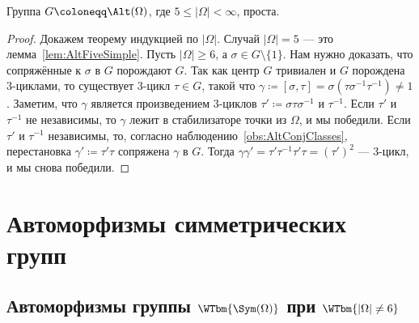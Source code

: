\documentclass[
	extrafontsizes,
	11pt,
	hyphens,
]{memoir}
\begin{document}
\begin{theorem}
Группа \(G \coloneqq \Alt(\Omega)\), где \(5 \leq \lvert \Omega \rvert < \infty\), проста.
\end{theorem}

\begin{proof}
Докажем теорему индукцией по \(\lvert \Omega \rvert\).
Случай \(\lvert \Omega \rvert = 5\) --- это лемма~\ref{lem:AltFiveSimple}.
Пусть \(\lvert \Omega \rvert \geq 6\),
а \(\sigma \in G \setminus \{1\}\).
Нам нужно доказать, что сопряжённые к \(\sigma\) в \(G\) порождают \(G\).
Так как центр \(G\) тривиален и \(G\) порождена \(3\)-цик\-ла\-ми, то существует \(3\)-цикл \(\tau \in G\), такой что \(\gamma \coloneqq [\sigma, \tau] = \sigma (\tau \sigma^{-1} \tau^{-1}) \neq 1\).
Заметим, что \(\gamma\) является произведением \(3\)-цик\-лов \(\tau' \coloneqq \sigma \tau \sigma^{-1}\) и \(\tau^{-1}\).
Если \(\tau'\) и \(\tau^{-1}\) не независимы, то \(\gamma\) лежит в стабилизаторе точки из \(\Omega\), и мы победили.
Если \(\tau'\) и \(\tau^{-1}\) независимы, то, согласно наблюдению~\ref{obs:AltConjClasses}, перестановка \(\gamma' \coloneqq \tau' \tau\) сопряжена \(\gamma\) в \(G\). Тогда \(\gamma \gamma' = \tau' {\tau}^{-1} \tau' \tau = (\tau')^2\) --- \(3\)-цикл, и мы снова победили.
\end{proof}


\section{Автоморфизмы симметрических групп}


\subsection{Автоморфизмы группы \texorpdfstring{\(\WTbm{\Sym(\Omega)}\)}{\textbackslash{}Sym(\textbackslash{}Omega)} при \texorpdfstring{\(\WTbm{\lvert \Omega \rvert \neq 6}\)}{\textbackslash{}lvert \textbackslash{}Omega \textbackslash{}rvert \textbackslash{}neq 6}}
\end{document}
